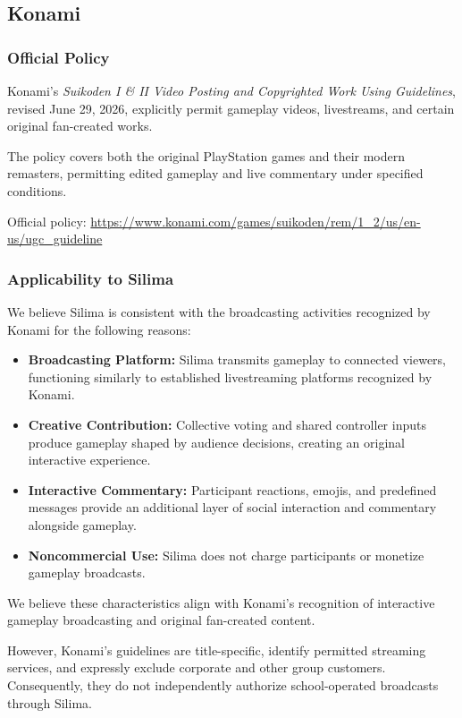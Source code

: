 
\subsection{Konami}

\subsubsection{Official Policy}

Konami's \textit{Suikoden I \& II Video Posting and
Copyrighted Work Using Guidelines}, revised June 29,
2026, explicitly permit gameplay videos, livestreams,
and certain original fan-created works.

The policy covers both the original PlayStation games
and their modern remasters, permitting edited gameplay
and live commentary under specified conditions.

Official policy:
\url{https://www.konami.com/games/suikoden/rem/1_2/us/en-us/ugc_guideline}

\subsubsection{Applicability to Silima}

We believe Silima is consistent with the broadcasting
activities recognized by Konami for the following reasons:

\begin{itemize}
    \item \textbf{Broadcasting Platform:}
    Silima transmits gameplay to connected viewers,
    functioning similarly to established livestreaming
    platforms recognized by Konami.

    \item \textbf{Creative Contribution:}
    Collective voting and shared controller inputs
    produce gameplay shaped by audience decisions,
    creating an original interactive experience.

    \item \textbf{Interactive Commentary:}
    Participant reactions, emojis, and predefined
    messages provide an additional layer of social
    interaction and commentary alongside gameplay.

    \item \textbf{Noncommercial Use:}
    Silima does not charge participants or monetize
    gameplay broadcasts.
\end{itemize}

We believe these characteristics align with Konami's
recognition of interactive gameplay broadcasting and
original fan-created content.

However, Konami's guidelines are title-specific,
identify permitted streaming services, and expressly
exclude corporate and other group customers.
Consequently, they do not independently authorize
school-operated broadcasts through Silima.
